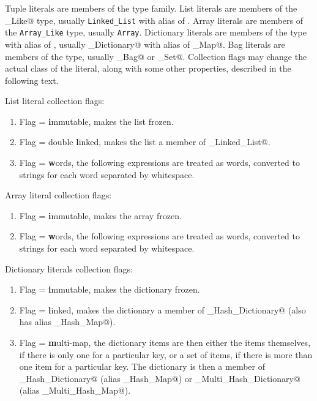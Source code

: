 Tuple literals are members of the \lstinline@Tuple@ type family. List literals are members of the \lstinline@List_Like@ type, usually \lstinline!Linked_List! with alias of \lstinline@List@. Array literals are members of the \lstinline!Array_Like! type, usually \lstinline!Array!. Dictionary literals are members of the \lstinline@Dictionary@ type with alias of \lstinline@Map@, usually \lstinline@Hash_Dictionary@ with alias of \lstinline@Hash_Map@. Bag literals are members of the \lstinline@Bag@ type, usually \lstinline@Hash_Bag@ or \lstinline@Hash_Set@. Collection flags may change the actual class of the literal, along with some other properties, described in the following text. 

List literal collection flags: 

\begin{enumerate}
  \item Flag \lstinline@i@ = \textbf{i}mmutable, makes the list frozen. 
  \item Flag \lstinline@l@ = double \textbf{l}inked, makes the list a member of \lstinline@Double_Linked_List@. 
  \item Flag \lstinline@w@ = \textbf{w}ords, the following expressions are treated as words, converted to strings for each word separated by whitespace.
\end{enumerate}

Array literal collection flags:

\begin{enumerate}
  \item Flag \lstinline@i@ = \textbf{i}mmutable, makes the array frozen.
  \item Flag \lstinline@w@ = \textbf{w}ords, the following expressions are treated as words, converted to strings for each word separated by whitespace. 
\end{enumerate}

Dictionary literals collection flags:

\begin{enumerate}
  \item Flag \lstinline@i@ = \textbf{i}mmutable, makes the dictionary frozen. 
  \item Flag \lstinline@l@ = \textbf{l}inked, makes the dictionary a member of \lstinline@Linked_Hash_Dictionary@ (also has alias \lstinline@Linked_Hash_Map@).
  \item Flag \lstinline@m@ = \textbf{m}ulti-map, the dictionary items are then either the items themselves, if there is only one for a particular key, or a set of items, if there is more than one item for a particular key. The dictionary is then a member of \lstinline@Multi_Hash_Dictionary@ (alias \lstinline@Multi_Hash_Map@) or \lstinline@Linked_Multi_Hash_Dictionary@ (alias \lstinline@Linked_Multi_Hash_Map@). 
\end{enumerate}

